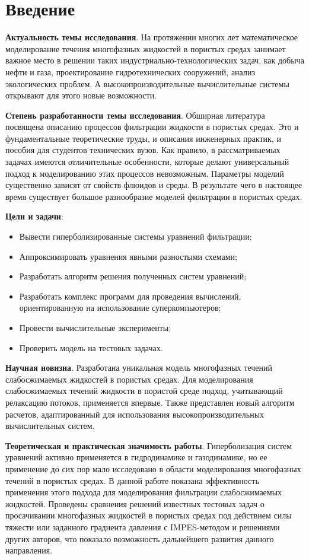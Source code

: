 \chapter*{Введение}                         %
\textbf{Актуальность темы исследования}. На протяжении многих лет математическое моделирование течения многофазных жидкостей в пористых средах занимает важное место в решении таких индустриально-технологических задач, как добыча нефти и газа, проектирование гидротехнических сооружений, анализ экологических проблем. 
А высокопроизводительные вычислительные системы открывают для этого новые возможности.

\textbf{Степень разработанности темы исследования}. Обширная литература посвящена описанию процессов фильтрации
жидкости в пористых средах. Это и фундаментальные теоретические труды, и описания инженерных практик, и пособия для студентов технических вузов. Как правило, в рассматриваемых задачах имеются отличительные особенности,
которые делают универсальный подход к моделированию этих процессов невозможным.
Параметры моделий существенно зависят от свойств флюидов и среды.
В результате чего в настоящее время существует большое разнообразие моделей фильтрации в пористых средах.

\textbf{Цели и задачи}:
\begin{itemize}
 \item Вывести гиперболизированные системы уравнений фильтрации;
 \item Аппроксимировать уравнения явными разностыми схемами;
 \item Разработать алгоритм решения полученных систем уравнений;
 \item Разработать комплекс программ для проведения вычислений, ориентированную на использование суперкомпьютеров;
 \item Провести вычислительные эксперименты;
 \item Проверить модель на тестовых задачах.
\end{itemize}

\textbf{Научная новизна}. Разработана уникальная модель многофазных течений слабосжимаемых жидкостей в пористых средах.
Для моделирования слабосжимаемых течений жидкости в пористой среде подход, учитывающий релаксацию потоков, применяется впервые.
Также представлен новый алгоритм расчетов, адаптированный для использования высокопроизводительных вычислительных систем.

\textbf{Теоретическая и практическая значимость работы}. Гиперболизация систем уравнений активно применяется в гидродинамике и газодинамике, но ее применение  до сих пор мало исследовано в области моделирования многофазных течений в пористых средах. В данной работе показана эффективность применения этого подхода для моделирования фильтрации слабосжимаемых жидкостей. Проведены сравнения решений известных тестовых задач о просачивании многофазных жидкостей в пористых средах под действием силы тяжести или заданного градиента давления с IMPES-методом и решениями других авторов, что показало возможность дальнейшего развития данного направления.

